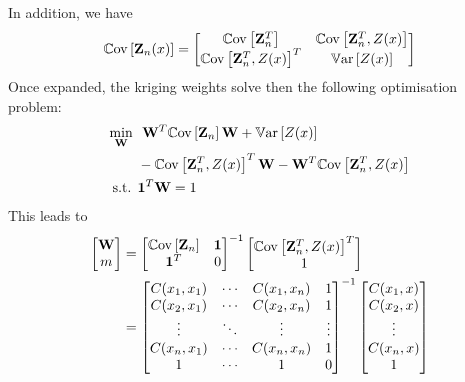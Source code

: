 \documentclass[../../Main_ManuscritThese.tex]{subfiles}
\begin{document}
In addition, we have
\begin{equation}
  \mathbb{C}\mathrm{ov}\left[\mathbf{Z}_n(x) \right] =
  \begin{bmatrix}
    \mathbb{C}\mathrm{ov}\left[ \mathbf{Z}_n^T\right]
    & \mathbb{C}\mathrm{ov}\left[\mathbf{Z}_n^T, Z(x) \right]
  \\
  \mathbb{C}\mathrm{ov}\left[\mathbf{Z}_n^T, Z(x) \right]^T & \mathbb{V}\mathrm{ar}\left[Z(x)\right]
  \end{bmatrix}
\end{equation}
Once expanded, the kriging weights solve then the following optimisation problem:
\begin{align}
  \min_{\mathbf{W}} ~&~\mathbf{W}^T \mathbb{C}\mathrm{ov}\left[\mathbf{Z}_n\right] \mathbf{W}+ \mathbb{V}\mathrm{ar}\left[Z(x)\right] \\ &-\mathbb{C}\mathrm{ov}\left[\mathbf{Z}_n^T, Z(x) \right]^T \mathbf{W}- \mathbf{W}^T\mathbb{C}\mathrm{ov}\left[\mathbf{Z}_n^T, Z(x) \right] \\ 
  \text{s.t. }&  \mathbf{1}^T\mathbf{W} = 1
\end{align}
This leads to
\begin{align}
  \begin{bmatrix}
    \mathbf{W} \\ m
  \end{bmatrix}
  &=
  \begin{bmatrix}
    \mathbb{C}\mathrm{ov}\left[\mathbf{Z}_n\right] & \mathbf{1} \\
  \mathbf{1}^T & 0
\end{bmatrix}^{-1}
                 \begin{bmatrix}
                  \mathbb{C}\mathrm{ov}\left[\mathbf{Z}_n^T, Z(x) \right]^T \\ 1 
\end{bmatrix}
  \\ &=
    \begin{bmatrix}
      C(x_1, x_1) & \cdots & C(x_1, x_n) & 1 \\
      C(x_2, x_1) & \cdots & C(x_2, x_n) & 1 \\
      \vdots & \ddots & \vdots & \vdots \\
      C(x_n, x_1) & \cdots & C(x_n, x_n)& 1 \\
      1 & \cdots & 1 & 0
    \end{bmatrix}^{-1}
                       \begin{bmatrix}
                         C(x_1, x) \\
                         C(x_2, x) \\
                         \vdots \\
                         C(x_n, x) \\
                         1
                       \end{bmatrix}
\end{align}
\end{document}
